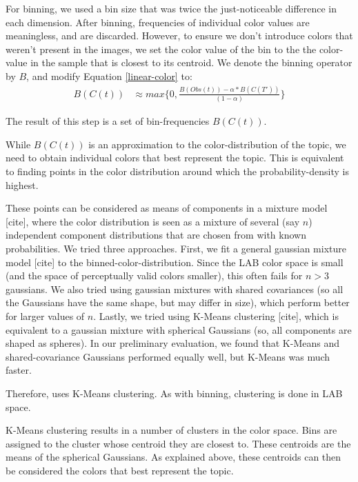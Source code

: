 For binning, we used a bin size that was twice the just-noticeable difference in each dimension. After binning, frequencies of individual color values are meaningless, and are discarded. However, to ensure we don't introduce colors that weren't present in the images, we set the color value of the bin to the the color-value in the sample that is closest to its centroid. We denote the binning operator by $B$, and modify Equation \ref{linear-color} to:
\begin{align}
\label{linear-color-bin}  
B(C(t)) &\approx max\{0,\frac{B(Obs(t)) - \alpha*B(C(T'))}{(1-\alpha)}\}
\end{align}

The result of this step is a set of bin-frequencies $B(C(t))$.

While $B(C(t))$ is an approximation to the color-distribution of the topic, we need to obtain individual colors that best represent the topic. This is equivalent to finding points in the color distribution around which the probability-density is highest. 

These points can be considered as means of components in a mixture model [cite], where the color distribution is seen as a mixture of several (say $n$) independent component distributions  that are chosen from with known probabilities. We tried three approaches. First, we fit a general gaussian mixture model [cite] to the binned-color-distribution. Since the LAB color space is small (and the space of perceptually valid colors smaller), this often fails for $n>3$ gaussians. We also tried using gaussian mixtures with shared covariances (so all the Gaussians have the same shape, but may differ in size), which perform better for larger values of $n$. Lastly, we tried using K-Means clustering [cite], which is equivalent to a gaussian mixture with spherical Gaussians (so, all components are shaped as spheres). In our preliminary evaluation, we found that K-Means and shared-covariance Gaussians performed equally well, but K-Means was much faster. 

Therefore, \system uses K-Means clustering. As with binning, clustering is done in LAB space.

K-Means clustering results in a number of clusters in the color space. Bins are assigned to the cluster whose centroid they are closest to. These centroids are the means of the spherical Gaussians. As explained above, these centroids can then be considered the colors that best represent the topic.

